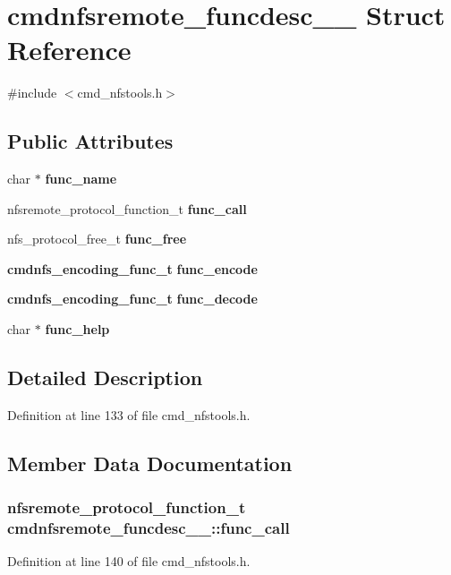 \section{cmdnfsremote\_\-funcdesc\_\-\_\- Struct Reference}
\label{structcmdnfsremote__funcdesc____}


{\ttfamily \#include $<$cmd\_\-nfstools.h$>$}\subsection*{Public Attributes}
\begin{DoxyCompactItemize}
\item 
char $\ast$ {\bf func\_\-name}
\item 
nfsremote\_\-protocol\_\-function\_\-t {\bf func\_\-call}
\item 
nfs\_\-protocol\_\-free\_\-t {\bf func\_\-free}
\item 
{\bf cmdnfs\_\-encoding\_\-func\_\-t} {\bf func\_\-encode}
\item 
{\bf cmdnfs\_\-encoding\_\-func\_\-t} {\bf func\_\-decode}
\item 
char $\ast$ {\bf func\_\-help}
\end{DoxyCompactItemize}


\subsection{Detailed Description}


Definition at line 133 of file cmd\_\-nfstools.h.

\subsection{Member Data Documentation}
\subsubsection[{func\_\-call}]{\setlength{\rightskip}{0pt plus 5cm}nfsremote\_\-protocol\_\-function\_\-t {\bf cmdnfsremote\_\-funcdesc\_\-\_\-::func\_\-call}}\label{structcmdnfsremote__funcdesc_____ab9c6cb6f4516f3899623a123a419668f}


Definition at line 140 of file cmd\_\-nfstools.h.
